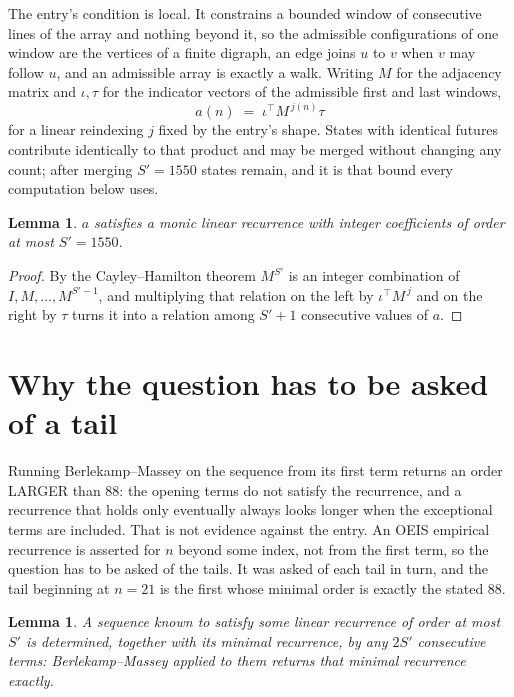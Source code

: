 \documentclass[11pt,a4paper]{article}
\theoremstyle{plain}
\newtheorem{lemma}[theorem]{Lemma}
\theoremstyle{definition}
\begin{document}
The entry's condition is local. It constrains a bounded window of consecutive lines of the
array and nothing beyond it, so the admissible configurations of one window are the vertices of
a finite digraph, an edge joins $u$ to $v$ when $v$ may follow $u$, and an admissible array is
exactly a walk. Writing $M$ for the adjacency matrix and $\iota,\tau$ for the indicator vectors
of the admissible first and last windows,
\[
a(n)\;=\;\iota^{\!\top}M^{\,j(n)}\tau
\]
for a linear reindexing $j$ fixed by the entry's shape. States with identical futures
contribute identically to that product and may be merged without changing any count; after
merging $S'=1550$ states remain, and it is that bound every computation below uses.

\begin{lemma}\label{lem:cf}
$a$ satisfies a monic linear recurrence with integer coefficients of order at most $S'=1550$.
\end{lemma}

\begin{proof}
By the Cayley--Hamilton theorem $M^{S'}$ is an integer combination of $I,M,\dots,M^{S'-1}$,
and multiplying that relation on the left by $\iota^{\!\top}M^{\,j}$ and on the right by
$\tau$ turns it into a relation among $S'+1$ consecutive values of $a$.
\end{proof}

\section{Why the question has to be asked of a tail}

Running Berlekamp--Massey on the sequence from its first term returns an order LARGER than $88$: the opening terms do not satisfy the recurrence, and a recurrence that holds only eventually always looks longer when the exceptional terms are included. That is not evidence against the entry. An OEIS empirical recurrence is asserted for $n$ beyond some index, not from the first term, so the question has to be asked of the tails. It was asked of each tail in turn, and the tail beginning at $n=21$ is the first whose minimal order is exactly the stated $88$.

\begin{lemma}\label{lem:bm}
A sequence known to satisfy some linear recurrence of order at most $S'$ is determined,
together with its minimal recurrence, by any $2S'$ consecutive terms: Berlekamp--Massey applied
to them returns that minimal recurrence exactly.
\end{lemma}
\end{document}
